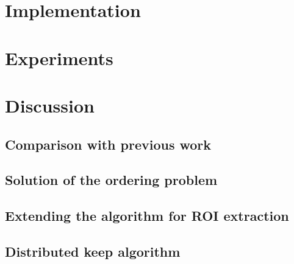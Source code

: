 \documentclass[conference]{IEEEtran}
\begin{document}
\section*{Implementation}

\section*{Experiments}

\section*{Discussion}

\subsection{Comparison with previous work}
\subsection{Solution of the ordering problem}
\subsection{Extending the algorithm for ROI extraction}
\subsection{Distributed keep algorithm}
\end{document}
